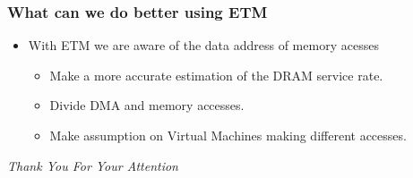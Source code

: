 \documentclass{beamer}
\begin{document}
\begin{frame}
    \frametitle{What can we do better using ETM}
    \begin{itemize}
        \item With ETM we are aware of the data address of memory acesses
            \begin{itemize}
                \item Make a more accurate estimation of the DRAM service rate.
                \item Divide DMA and memory accesses.
                \item Make assumption on Virtual Machines making different
                    accesses.
            \end{itemize}
    \end{itemize}
\end{frame}

\begin{frame}
  \centering \Large
  \emph{Thank You For Your Attention}
\end{frame}
\end{document}
